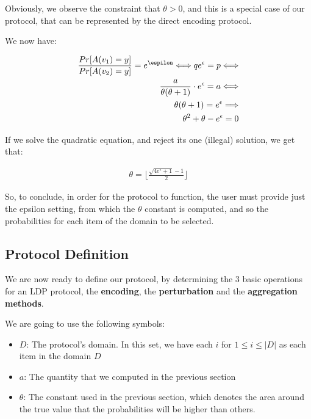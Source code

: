 Obviously, we observe the constraint that $\theta > 0$, and this is a special case of our protocol, that can be represented by the direct encoding protocol.

We now have:

\begin{align*}
    \frac{Pr[A(v_1) = y]}{Pr[A(v_2) = y]} = e^{\espilon} \Longleftrightarrow 
    q e^{\epsilon} = p \Longleftrightarrow \\
    \frac{a}{\theta(\theta + 1)} \cdot e^{\epsilon} =  a \Longleftrightarrow \\
    \theta(\theta + 1) = e^{\epsilon} \Longrightarrow \\
    \theta^2 + \theta - e^\epsilon = 0
\end{align*}

If we solve the quadratic equation, and reject its one (illegal) solution, we get that:

\begin{align}
    \theta = \lfloor \frac{\sqrt{4e^{\epsilon} + 1} - 1}{2}\rfloor
\end{align}

So, to conclude, in order for the protocol to function, the user must provide just the epsilon setting, from which the $\theta$ constant is computed, and so the probabilities for each item of the domain to be selected.  


\subsection{Protocol Definition}

We are now ready to define our protocol, by determining the 3 basic operations for an LDP protocol, the \textbf{encoding}, the \textbf{perturbation} and the \textbf{aggregation methods}.


We are going to use the following symbols:
\begin{itemize}
    \item $D$: The protocol's domain. In this set, we have each $i$ for $1 \leq i \leq |D|$ as each item in the domain $D$
    \item $a$: The quantity that we computed in the previous section
    \item $\theta$: The constant used in the previous section, which denotes the area around the true value that the probabilities will be higher than others.
    
\end{itemize}

